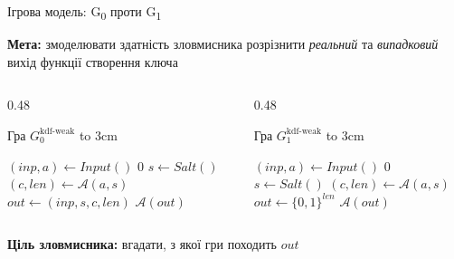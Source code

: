 \documentclass{beamer}
\begin{document}
\begin{frame}[fragile]{Ігрова модель: G\textsubscript{0} проти G\textsubscript{1}}

\vspace{0.5em}
\textbf{Мета:} змоделювати здатність зловмисника розрізнити \textit{реальний} та \textit{випадковий} вихід функції створення ключа

\vspace{0.2em}

\begin{columns}
  \begin{column}{0.48\textwidth}
    \scriptsize
    \begin{block}{Гра $G_0^{\text{kdf-weak}}$}
      \vbox to 3cm {
        \begin{algorithmic}
          \State $(inp, a) \gets \mathit{Input()}$
            \State \Return $0$
          \EndIf
          \State $s \gets \mathit{Salt()}$
          \State $(c, len) \gets \mathcal{A}(a, s)$
          \State $out \gets (inp, s, c, len)$
          \State \Return $\mathcal{A}(out)$
        \end{algorithmic}
        \vfill
      }
    \end{block}
  \end{column}

  \begin{column}{0.48\textwidth}
    \scriptsize
    \begin{block}{Гра $G_1^{\text{kdf-weak}}$}
      \vbox to 3cm {
        \begin{algorithmic}
          \State $(inp, a) \gets \mathit{Input()}$
            \State \Return $0$
          \EndIf
          \State $s \gets \mathit{Salt()}$
          \State $(c, len) \gets \mathcal{A}(a, s)$
          \State $out \gets \{0,1\}^{len}$ 
          \State \Return $\mathcal{A}(out)$
        \end{algorithmic}
        \vfill
      }
    \end{block}
  \end{column}
\end{columns}


\vspace{0.5em}
\textbf{Ціль зловмисника:} вгадати, з якої гри походить $out$

\end{frame}
\end{document}
